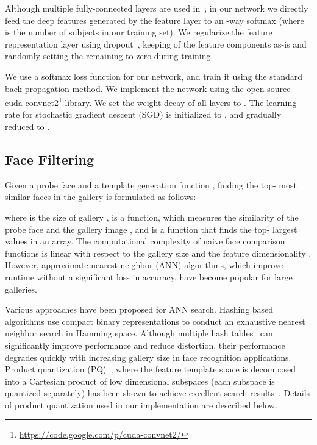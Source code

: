 \documentclass[10pt,journal,compsoc]{IEEEtran}
\begin{document}
Although multiple fully-connected layers are used in~\cite{dl:alex2012, self:wan2014}, in our network we directly feed the deep features generated by the feature layer to an -way softmax (where  is the number of subjects in our training set). We regularize the feature representation layer using dropout~\cite{dl:dropout}, keeping  of the feature components as-is and randomly setting the remaining  to zero during training.



We use a softmax loss function for our network, and train it using the standard back-propagation method. We implement the network using the open source cuda-convnet2\footnote{\url{https://code.google.com/p/cuda-convnet2/}} library. We set the weight decay of all layers to . The learning rate for stochastic gradient descent (SGD) is initialized to , and gradually reduced to .

\subsection{Face Filtering}
Given a probe face  and a template generation function , finding the top- most similar faces  in the gallery  is formulated as follows:


\noindent where  is the size of gallery ,  is a function, which measures the similarity of the probe face  and the gallery image , and  is a function that finds the top- largest values in an array. The computational complexity of naive face comparison functions is linear with respect to the gallery size  and the feature dimensionality . However, approximate nearest neighbor (ANN) algorithms, which improve runtime
without a significant loss in accuracy, have become popular for large galleries.

Various approaches have been proposed for ANN search. Hashing based algorithms use compact binary representations to conduct an exhaustive nearest neighbor search in Hamming space. Although multiple hash tables~\cite{retrieval:LSH} can significantly improve performance and reduce distortion, their performance degrades quickly with increasing gallery size in face recognition applications. Product quantization (PQ)~\cite{retrieval:pq}, where the feature template space is decomposed into a Cartesian product of low dimensional subspaces (each subspace is quantized separately) has been shown to achieve excellent search results~\cite{retrieval:pq}. Details of product quantization used in our implementation are described below.
\end{document}
